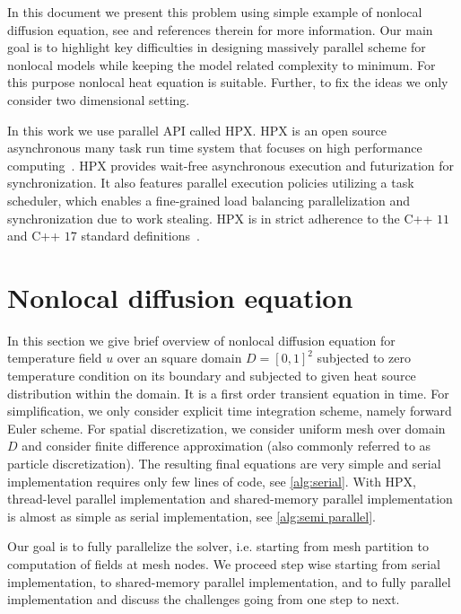 \documentclass[11pt,twocolumn]{amsart}
\theoremstyle{definition}
\theoremstyle{definition}
\numberwithin{equation}{section}
\numberwithin{equation}{section}
\begin{document}
In this document we present this problem using simple example of nonlocal diffusion equation, see \cite{burch2011classical} and references therein for more information. Our main goal is to highlight key difficulties in designing massively parallel scheme for nonlocal models while keeping the model related complexity to minimum. For this purpose nonlocal heat equation is suitable. Further, to fix the ideas we only consider two dimensional setting. 

In this work we use parallel API called HPX. HPX is an open source asynchronous many task run time system that focuses on high performance computing~\cite{Heller2017,tabbal2011preliminary,kaiser2014hpx}. HPX provides wait-free asynchronous execution and futurization for synchronization. It also features parallel execution policies utilizing a task scheduler, which enables a fine-grained load balancing parallelization and synchronization due to work stealing. HPX is in strict adherence to the C++ $11$~\cite{cxx11_standard} and C++ $17$ standard definitions~\cite{cxx17_standard}.\\


\section{Nonlocal diffusion equation}
In this section we give brief overview of nonlocal diffusion equation for temperature field $u$ over an square domain $D = [0,1]^2$ subjected to zero temperature condition on its boundary and subjected to given heat source distribution within the domain. It is a first order transient equation in time. For simplification, we only consider explicit time integration scheme, namely forward Euler scheme. For spatial discretization, we consider uniform mesh over domain $D$ and consider finite difference approximation (also commonly referred to as particle discretization). The resulting final equations are very simple and serial implementation requires only few lines of code, see \autoref{alg:serial}. With HPX, thread-level parallel implementation and shared-memory parallel implementation is almost as simple as serial implementation, see \autoref{alg:semi parallel}. 

Our goal is to fully parallelize the solver, i.e. starting from mesh partition to computation of fields at mesh nodes. We proceed step wise starting from serial implementation, to shared-memory parallel implementation, and to fully parallel implementation and discuss the challenges going from one step to next. 
\end{document}
